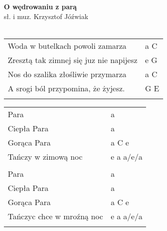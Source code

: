 \documentclass[a5paper]{article}
\begin{document}


\noindent
\fontsize{12pt}{15pt}\selectfont
\textbf{O wędrowaniu z parą} \\
\fontsize{8pt}{10pt}\selectfont
sł. i muz. Krzysztof Jóźwiak \\ \\
\fontsize{10pt}{12pt}\selectfont
{}
\begin{tabular}{@{}p{7.50cm}p{3cm}@{}}
\noindent
Woda w butelkach powoli zamarza & a C \\
Zresztą tak zimnej się juz nie napijesz & e G \\
Nos do szalika złośliwie przymarza & a C \\
A srogi ból przypomina, że żyjesz. & G E \\\\
\end{tabular}

\noindent
\begin{tabular}{@{}p{6.50cm}p{3cm}@{}}
Para & a \\
Ciepła Para & a \\
Gorąca Para & a C e \\
Tańczy w zimową noc & e a a/e/a\\\\

Para & a \\
Ciepła Para & a \\
Gorąca Para & a C e \\
Tańczyc chce w mroźną noc & e a a/e/a \\ \\
\end{tabular}
\end{document}

